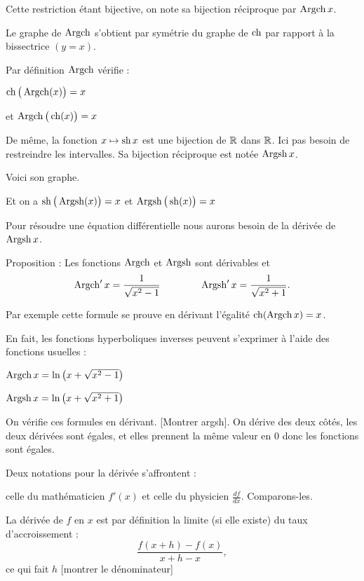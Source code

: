\change
Cette restriction étant bijective, on note sa bijection réciproque par 
$\mathop{\mathrm{Argch}}\nolimits x$.

\change
Le graphe de $\mathop{\mathrm{Argch}}\nolimits$ s'obtient par symétrie du graphe de $\mathop{\mathrm{ch}}\nolimits$ par rapport à la bissectrice
$(y=x)$.

\change
Par définition $\mathop{\mathrm{Argch}}\nolimits$ vérifie :

$\mathop{\mathrm{ch}}\nolimits\big(\mathop{\mathrm{Argch}}\nolimits(x)\big) = x$

\change
et $\mathop{\mathrm{Argch}}\nolimits\big(\mathop{\mathrm{ch}}\nolimits(x)\big) = x$


\change 
De même, la fonction $x \mapsto \mathop{\mathrm{sh}}\nolimits x$ est une bijection
de $\mathbb{R}$ dans $\mathbb{R}$. Ici pas besoin de restreindre les intervalles.
Sa bijection réciproque est 
notée $\mathop{\mathrm{Argsh}}\nolimits x$.

Voici son graphe.

Et on a 
$\mathop{\mathrm{sh}}\nolimits\big(\mathop{\mathrm{Argsh}}\nolimits(x)\big) = x$ et 
$\mathop{\mathrm{Argsh}}\nolimits\big(\mathop{\mathrm{sh}}\nolimits(x)\big) = x$

\diapo

Pour résoudre une équation différentielle nous aurons besoin 
de la dérivée de $\mathop{\mathrm{Argsh}}\nolimits x$.


Proposition :
Les fonctions $\mathop{\mathrm{Argch}}\nolimits$ et $\mathop{\mathrm{Argsh}}\nolimits$
sont dérivables et 
$$\mathop{\mathrm{Argch}}\nolimits' x = \frac{1}{\sqrt{x^2-1}} \qquad\qquad \mathop{\mathrm{Argsh}}\nolimits' x = \frac{1}{\sqrt{x^2+1}}.$$


Par exemple cette formule se prouve en dérivant l'égalité $\mathop{\mathrm{ch}}\nolimits(\mathop{\mathrm{Argch}}\nolimits x) = x$.



\diapo

En fait, les fonctions hyperboliques inverses 
peuvent s'exprimer à l'aide des fonctions usuelles :

$\mathop{\mathrm{Argch}}\nolimits x  =  \ln\left( x+\sqrt{x^2-1} \right)$

$\mathop{\mathrm{Argsh}}\nolimits x  =  \ln\left( x+\sqrt{x^2+1} \right)$

On vérifie ces formules en dérivant. [Montrer argsh]. On dérive des deux côtés, 
les deux dérivées sont égales, et elles prennent la même valeur en $0$ donc les fonctions sont égales.


\diapo



Deux notations pour la dérivée s'affrontent : 


celle du mathématicien $f'(x)$ et celle du physicien $\frac{df}{dx}$. 
Comparons-les.

\change
La dérivée de $f$ en $x$ est par définition la limite (si elle existe) 
du taux d'accroissement :
$$\frac{f(x+h)-f(x)}{x+h-x},$$
ce qui fait $h$ [montrer le dénominateur]


